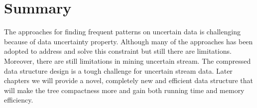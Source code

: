 \section{Summary}
The approaches for finding frequent patterns on uncertain data is challenging because of data uncertainty property. Although many of the approaches has been adopted to address and solve this constraint but still there are limitations. Moreover, there are still limitations in mining uncertain stream. The compressed data structure design is a tough challenge for uncertain stream data. Later chapters we will provide a novel, completely new and efficient data structure that will make the tree compactness more and gain both running time and memory efficiency.
%
